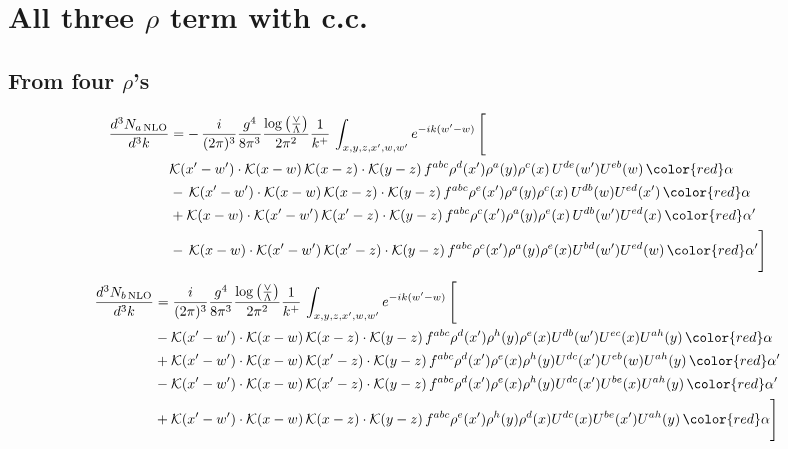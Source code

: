 \section{All three $\rho$ term with c.c.}
\subsection{From four $\rho$'s}
\begin{align}
    \frac{d^{3}N_{a\,\rm NLO}}{d^{3}k} & = -\,\frac{i}{(2\pi)^{3}}\frac{g^{4}}{8\pi^{3}}\frac{\log{\left(\frac{\vee}{\Lambda}\right)}}{2\pi^{2}} \frac{1}{k^{+}}\,\int_{x,y,z,x^{\prime},w,w^{\prime}}e^{-ik(w^{\prime}-w)}\, \Bigg[\notag \\ &  \mathcal{K}(x'-w')\cdot \mathcal{K}(x-w)\, \mathcal{K}(x-z)\cdot \mathcal{K}(y-z)\, f^{a b c} \rho^{d}(x') \rho^{a}(y) \rho^{c}(x)\,U^{d e}(w') U^{e b}(w)\, {\color{red} \alpha} \nonumber\\
    &  -\,\mathcal{K}(x'-w')\cdot \mathcal{K}(x-w)\, \mathcal{K}(x-z)\cdot \mathcal{K}(y-z)\, f^{a b c} \rho^{e}(x') \rho^{a}(y) \rho^{c}(x)\, U^{d b}(w) U^{e d}(x')\, {\color{red} \alpha}\nonumber\\
    & + \mathcal{K}(x-w)\cdot \mathcal{K}(x'-w')\, \mathcal{K}(x'-z)\cdot \mathcal{K}(y-z)\, f^{a b c} \rho^{c}(x') \rho^{a}(y) \rho^{e}(x)\,U^{d b}(w') U^{e d}(x)\, {\color{red} \alpha'} \nonumber\\
    & -\,\mathcal{K}(x-w)\cdot \mathcal{K}(x'-w')\, \mathcal{K}(x'-z)\cdot \mathcal{K}(y-z)\, f^{a b c} \rho^{c}(x') \rho^{a}(y) \rho^{e}(x) U^{b d}(w') U^{e d}(w)\, {\color{red} \alpha'}\Bigg]
\end{align}
\begin{align}
      \frac{d^{3}N_{b\,\rm NLO}}{d^{3}k} & = \frac{i}{(2\pi)^{3}}\frac{g^{4}}{8\pi^{3}}\frac{\log{\left(\frac{\vee}{\Lambda}\right)}}{2\pi^{2}} \frac{1}{k^{+}}\,\int_{x,y,z,x^{\prime},w,w^{\prime}}e^{-ik(w^{\prime}-w)}\, \Bigg[\notag \\ & - \mathcal{K}(x'-w')\cdot \mathcal{K}(x-w)\, \mathcal{K}(x-z)\cdot \mathcal{K}(y-z)\, f^{a b c} \rho^{d}(x') \rho^{h}(y) \rho^{e}(x) U^{d b}(w') U^{e c}(x) U^{a h}(y)\, {\color{red} \alpha}\nonumber\\
    &+ \mathcal{K}(x'-w')\cdot \mathcal{K}(x-w)\,\mathcal{K}(x'-z)\cdot \mathcal{K}(y-z)\, f^{a b c} \rho^{d}(x') \rho^{e}(x) \rho^{h}(y) U^{d c}(x') U^{e b}(w) U^{a h}(y)\, {\color{red} \alpha'}\nonumber\\
    &- \mathcal{K}(x'-w')\cdot \mathcal{K}(x-w)\,\mathcal{K}(x'-z)\cdot \mathcal{K}(y-z)\, f^{a b c} \rho^{d}(x') \rho^{e}(x) \rho^{h}(y) U^{d c}(x') U^{b e}(x) U^{a h}(y)\, {\color{red} \alpha'}\nonumber\\
    &+  \mathcal{K}(x'-w')\cdot \mathcal{K}(x-w)\, \mathcal{K}(x-z)\cdot \mathcal{K}(y-z)\, f^{a b c} \rho^{e}(x') \rho^{h}(y) \rho^{d}(x) U^{d c}(x) U^{b e}(x') U^{a h}(y)\, {\color{red} \alpha} \Bigg]
\end{align}
